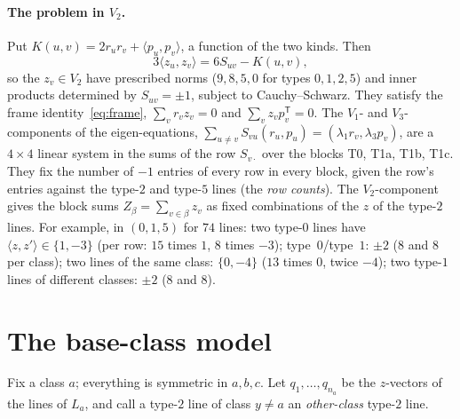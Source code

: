 \documentclass[11pt]{article}
\theoremstyle{definition}
\begin{document}
\paragraph{The problem in $V_2$.} Put $K(u,v)=2r_ur_v+\langle p_u,p_v\rangle$, a function of the two kinds.
Then
\begin{equation}\label{eq:zz}
3\langle z_u,z_v\rangle=6S_{uv}-K(u,v),
\end{equation}
so the $z_v\in V_2$ have prescribed norms ($9,8,5,0$ for types $0,1,2,5$) and inner products determined
by $S_{uv}=\pm1$, subject to Cauchy--Schwarz. They satisfy the frame identity~\eqref{eq:frame},
$\sum_vr_vz_v=0$ and $\sum_vz_vp_v^{\mathsf T}=0$. The $V_1$- and $V_3$-components of the eigen-equations,
$\sum_{u\ne v}S_{vu}(r_u,p_u)=(\lambda_1r_v,\lambda_3p_v)$, are a $4\times4$ linear system in the sums of the
row $S_{v\cdot}$ over the blocks T0, T1a, T1b, T1c. They fix the number of $-1$ entries of every row in
every block, given the row's entries against the type-$2$ and type-$5$ lines (the \emph{row counts}). The
$V_2$-component gives the block sums $Z_\beta=\sum_{v\in\beta}z_v$ as fixed combinations of the $z$ of
the type-$2$ lines. For example, in $(0,1,5)$ for $74$ lines: two type-$0$ lines have
$\langle z,z'\rangle\in\{1,-3\}$ (per row: $15$ times $1$, $8$ times $-3$); type~$0$/type~$1$:
$\pm2$ ($8$ and $8$ per class); two lines of the same class: $\{0,-4\}$ ($13$ times $0$, twice $-4$); two
type-$1$ lines of different classes: $\pm2$ ($8$ and $8$).

\section{The base-class model}\label{sec:model}

Fix a class $a$; everything is symmetric in $a,b,c$. Let $q_1,\dots,q_{n_a}$ be the $z$-vectors of the
lines of $L_a$, and call a type-$2$ line of class $y\ne a$ an \emph{other-class} type-$2$ line.
\end{document}
